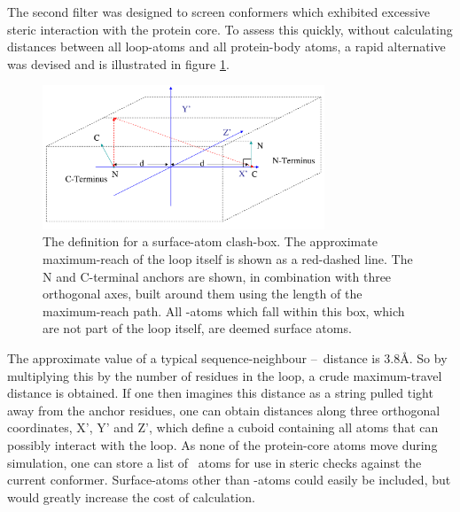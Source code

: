 The second filter was designed to screen conformers which exhibited excessive steric interaction with the protein core. To assess this quickly, without calculating distances between all loop-atoms and all protein-body atoms, a rapid alternative was devised and is illustrated in figure \ref{fig:reduced_rep:surface}.

\begin{figure}[hptb]
\begin{center}
\includegraphics[width=0.75\textwidth]{05-ReducedRep/conformer/surface_cache.pdf}
\end{center}
\caption[The definition for a surface-atom clash-box]{The definition for a surface-atom clash-box.
The approximate maximum-reach of the loop itself is shown as a red-dashed line.
The N and C-terminal anchors are shown, in combination with three orthogonal axes, built around them using the length of the
maximum-reach path. 
All \ca-atoms which fall within this box, which are not part of the loop itself, are deemed surface atoms.
}
\label{fig:reduced_rep:surface}
\end{figure}

The approximate value of a typical sequence-neighbour \ca--\ca\ distance is 3.8\AA. So by multiplying this by the number of residues in the loop, a crude maximum-travel distance is obtained. If one then imagines this distance as a string pulled tight away from the anchor residues, one can obtain distances along three orthogonal coordinates, X', Y' and Z', which define a cuboid containing all atoms that can possibly interact with the loop. As none of the protein-core atoms move during simulation, one can store a list of \ca\ atoms for use in steric checks against the current conformer. Surface-atoms other than \ca-atoms could easily be included, but would greatly increase the cost of calculation.

